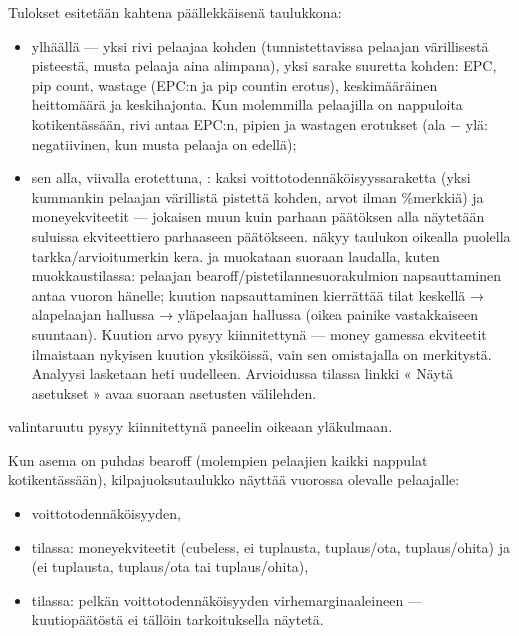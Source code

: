 \documentclass[letterpaper,10pt,finnish]{sphinxmanual}
\begin{document}
\sphinxAtStartPar
Tulokset esitetään kahtena päällekkäisenä taulukkona:
\begin{itemize}
\item {} 
\sphinxAtStartPar
ylhäällä  — yksi rivi pelaajaa kohden (tunnistettavissa pelaajan värillisestä pisteestä, musta pelaaja aina alimpana), yksi sarake suuretta kohden: EPC, pip count, wastage (EPC:n ja pip countin erotus), keskimääräinen heittomäärä ja keskihajonta. Kun molemmilla pelaajilla on nappuloita kotikentässään, \sphinxhyphen{}rivi antaa EPC:n, pipien ja wastagen  erotukset (ala − ylä: negatiivinen, kun musta pelaaja on edellä);

\item {} 
\sphinxAtStartPar
sen alla, viivalla erotettuna, : kaksi voittotodennäköisyyssaraketta (yksi kummankin pelaajan värillistä pistettä kohden, arvot ilman \%\sphinxhyphen{}merkkiä) ja money\sphinxhyphen{}ekviteetit — jokaisen muun kuin parhaan päätöksen alla näytetään suluissa ekviteettiero parhaaseen päätökseen.  näkyy taulukon oikealla puolella tarkka/arvioitu\sphinxhyphen{}merkin kera.  ja  muokataan suoraan laudalla, kuten muokkaustilassa: pelaajan bearoff/pistetilanne\sphinxhyphen{}suorakulmion napsauttaminen antaa vuoron hänelle; kuution napsauttaminen kierrättää tilat keskellä → alapelaajan hallussa → yläpelaajan hallussa (oikea painike vastakkaiseen suuntaan). Kuution arvo pysyy kiinnitettynä — money gamessa ekviteetit ilmaistaan nykyisen kuution yksiköissä, vain sen omistajalla on merkitystä. Analyysi lasketaan heti uudelleen. Arvioidussa tilassa linkki « Näytä asetukset » avaa suoraan asetusten \sphinxhyphen{}välilehden.

\end{itemize}

\sphinxAtStartPar
{}\sphinxhyphen{}valintaruutu pysyy kiinnitettynä paneelin oikeaan yläkulmaan.

\sphinxAtStartPar
Kun asema on puhdas bearoff (molempien pelaajien kaikki nappulat kotikentässään), kilpajuoksutaulukko näyttää vuorossa olevalle pelaajalle:
\begin{itemize}
\item {} 
\sphinxAtStartPar
voittotodennäköisyyden,

\item {} 
\sphinxAtStartPar
{} tilassa: money\sphinxhyphen{}ekviteetit (cubeless, ei tuplausta, tuplaus/ota, tuplaus/ohita) ja  (ei tuplausta, tuplaus/ota tai tuplaus/ohita),

\item {} 
\sphinxAtStartPar
{} tilassa: pelkän voittotodennäköisyyden virhemarginaaleineen — kuutiopäätöstä ei tällöin tarkoituksella näytetä.

\end{itemize}
\end{document}
